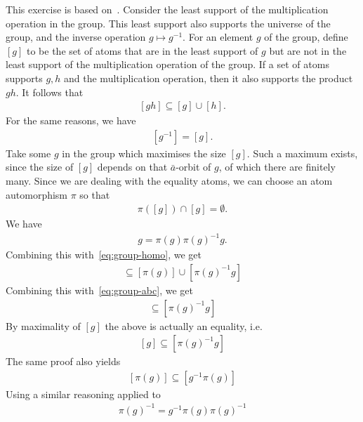  { This exercise is based on~\cite[Lemma 2.14]{DBLP:journals/corr/ColcombetLP14}.
Consider the least support of the multiplication operation in the group. This least support also supports the universe of the group, and the inverse operation $g \mapsto g^{-1}$. For an element $g$ of the group, define $[g]$ to be the set of atoms that are in the least support of $g$ but are not in the least support of the multiplication operation of the group. 
If a set of atoms supports $g,h $ and the multiplication operation, then it also supports the product $gh$. It follows that 
\begin{align}\label{eq:group-homo}
 [g h] \subseteq [g] \cup [h] .
\end{align}
For the same reasons, we have
\begin{align}
 \label{eq:group-homo2}
 [g^{-1}] = [g] .
\end{align}
Take some $g$ in the group which maximises the size $[g]$. Such a maximum exists, since the size of $[g]$ depends on that $\bar a$-orbit of $g$, of which there are finitely many. Since we are dealing with the equality atoms, we can choose an atom automorphism $\pi$ so that 
\begin{align}\label{eq:group-abc}
 \pi([g]) \cap [g] = \emptyset.
\end{align}
 We have
\begin{align*}
 g = \pi(g) \pi(g)^{-1} g.
\end{align*}
Combining this with~\eqref{eq:group-homo}, we get 
\begin{align*}
 [g] \subseteq [\pi(g)] \cup [\pi(g)^{-1} g]
\end{align*}
Combining this with~\eqref{eq:group-abc}, we get
\begin{align*}
 [g] \subseteq [\pi(g)^{-1}g]
\end{align*}
By maximality of $[g]$ the above is actually an equality, i.e.~
\begin{align}
 \label{eq:group-homo3}
 [g] \subseteq [\pi(g)^{-1}g]
\end{align}
The same proof also yields
\begin{align}
 \label{eq:group-homo4}
 [\pi(g)] \subseteq [g^{-1}\pi(g)]
\end{align}
 Using a similar reasoning applied to
\begin{align*}
 \pi(g)^{-1} = g^{-1} \pi(g) \pi(g)^{-1}
\end{align*}
}
